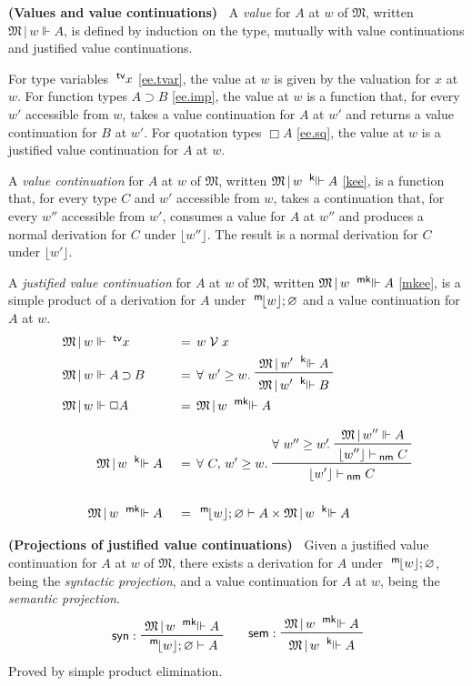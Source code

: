\documentclass{entcs}
\numberwithin{equation}{thm}
\newcommand{\tsf}[1]{\textsf{\upshape{#1}}}
\newcommand{\stsf}[1]{\tsf{\small{#1}}}
\renewcommand{\:}{\mathrel{:}}
\newcommand{\tyrule}[1]{\prftree[l]{${#1} \:\,$}}
\let\oldforall\forall
\renewcommand{\forall}{\oldforall\,}
\newcommand{\0}{\varnothing}
\newcommand{\tvar}{\operatorname{^{\stsf{tv}\mkern-4mu}}}
\newcommand{\imp}{\mathbin{\supset}}
\newcommand{\sq}{\Box}
\renewcommand{\e}{\mathrel{\vdash}}
\newcommand{\enm}{\mathrel{\vdash_{\mkern-2mu\stsf{nm}}}}
\newcommand{\M}{\mathfrak{M}}
\newcommand{\V}{\mathrel{\mathcal{V}}}
\newcommand{\peek}[1]{\mathopen{\lfloor}{#1}\mathclose{\rfloor}}
\newcommand{\mpeek}[1]{\mathopen{^{\stsf{m}\mkern-3mu}\lfloor}{#1}\mathclose{\rfloor}}
\newcommand{\ee}{\mathrel{\Vdash}}
\newcommand{\kee}{\mathrel{^{\stsf{k}\mkern-6mu}\Vdash}}
\newcommand{\mkee}{\mathrel{^{\stsf{mk}\mkern-6mu}\Vdash}}
\newcommand{\syn}{\operatorname{\tsf{syn}}}
\newcommand{\sem}{\operatorname{\tsf{sem}}}
\begin{document}
\begin{definition}
  \textbf{(Values and value continuations)\ }
  \label{ee/kee/mkee}
  A \emph{value} for $A$ at $w$ of $\M$, written $\M\,|\,w \ee A$, is defined by induction on the type, mutually with value continuations and justified value continuations.
  
  For type variables $\tvar x$ \eqref{ee.tvar}, the value at $w$ is given by the valuation for $x$ at $w$.
  For function types $A \imp B$ \eqref{ee.imp}, the value at $w$ is a function that, for every $w'$ accessible from $w$, takes a value continuation for $A$ at $w'$ and returns a value continuation for $B$ at $w'$.
  For quotation types $\sq A$ \eqref{ee.sq}, the value at $w$ is a justified value continuation for $A$ at $w$.
  
  A \emph{value continuation} for $A$ at $w$ of $\M$, written $\M\,|\,w \kee A$ \eqref{kee}, is a function that, for every type $C$ and $w'$ accessible from $w$, takes a continuation that, for every $w''$ accessible from $w'$, consumes a value for $A$ at $w''$ and produces a normal derivation for $C$ under $\peek{w''}$.  The result is a normal derivation for $C$ under $\peek{w'}$.
  
   A \emph{justified value continuation} for $A$ at $w$ of $\M$, written $\M\,|\,w \mkee A$ \eqref{mkee}, is a simple product of a derivation for $A$ under $\mpeek{w}; \0$ and a value continuation for $A$ at $w$.
  \begin{alignat}{3}
    \label{ee.tvar} & \rlap{$\M\,|\,w \ee \tvar x$}  &&\,&&=\, w \V x\\
    \label{ee.imp}  & \rlap{$\M\,|\,w \ee A \imp B$} &&\,&&=\, \forall w' \ge w.\ \raisebox{-8pt}{\prftree{\M\,|\,w' \kee A} {\M\,|\,w' \kee B}}\\
    \label{ee.sq}   & \rlap{$\M\,|\,w \ee \sq A$}    &&\,&&=\, \M\,|\,w \mkee A\\[0.5\baselineskip]
    \label{kee}     && \quad \M\,|\,w \kee A         &\,&&=\, \forall C,\,w' \ge w.\ \raisebox{-8pt}{\prftree{\raisebox{8pt}{$\forall w'' \ge w'\mkern-4mu.\ $} \prftree{\M\,|\,w'' \ee A}{\lfloor w'' \rfloor \enm C}}{\lfloor w' \rfloor \enm C}}\\[\baselineskip]
    \label{mkee}    && \quad \M\,|\,w \mkee A        &\,&&=\, \mpeek{w}; \0 \e A \times \M\,|\,w \kee A
  \end{alignat}
\end{definition}

\begin{lemma}
  \normalshape
  \textbf{(Projections of justified value continuations)\ }
  \label{syn/sem}
  Given a justified value continuation for $A$ at $w$ of $\M$, there exists a derivation for $A$ under $\mpeek{w}; \0$, being the \emph{syntactic projection}, and a value continuation for $A$ at $w$, being the \emph{semantic projection}.
  \begin{gather*}
    \tyrule{\syn}{\M\,|\, w \mkee A}{\mpeek{w}; \0 \e A}\qquad
    \tyrule{\sem}{\M\,|\, w \mkee A}{\M\,|\, w \kee A}
  \end{gather*}
  Proved by simple product elimination.
\end{lemma}
\end{document}
